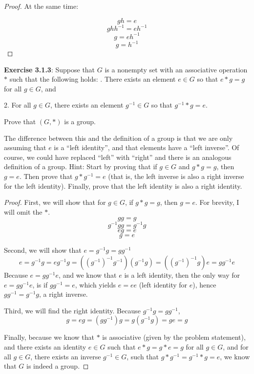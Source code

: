 \documentclass[a4paper]{article}
\begin{document}
\begin{myparindent}{0pt}
\begin{proof}
  At the same time:

  \[ gh = e \]
  \[ ghh^{-1} = eh^{-1} \]
  \[ g = eh^{-1} \]
  \[ g = h^{-1} \]
\end{proof}

\textbf{Exercise 3.1.3}:
Suppose that $G$ is a nonempty set with an associative operation $*$ such that
the following holds: . There exists an element $e \in G$ so that $e * g = g$ for all $g \in G$, and

2. For all $g \in G$, there exists an element $g^{-1} \in G$ so that
$g^{-1} * g = e$.

Prove that $(G, *)$ is a group. \newline

The difference between this and the definition of a group is that we are only
assuming that $e$ is a “left identity”, and that elements have a “left inverse”.
Of course, we could have replaced “left” with “right” and there is an analogous
definition of a group. Hint: Start by proving that if $g \in G$ and
$g * g = g$, then $g = e$. Then prove that $g * g^{-1} = e$ (that is, the left
inverse is also a right inverse for the left identity). Finally, prove that the
left identity is also a right identity. \newline

\begin{proof}
  First, we will show that for $g \in G$, if $g * g = g$, then $g = e$. For
  brevity, I will omit the $*$.
  \[ gg = g \]
  \[ g^{-1}gg = g^{-1} g \]
  \[ eg = e \]
  \[ g = e \]

  Second, we will show that $e = g^{-1}g = gg^{-1}$
  \[ e = g^{-1}g = eg^{-1}g = (({g^{-1}})^{-1}g^{-1}) (g^{-1}g) = (({g^{-1}})^{-1}g) e = gg^{-1}e \]
  Because $e = gg^{-1}e$, and we know that $e$ is a left identity, then the only
  way for $e = gg^{-1}e$, is if $gg^{-1} = e$, which yields $e = ee$ (left identity for $e$), hence $gg^{-1} = g^{-1}g$,
  a right inverse. \newline

  Third, we will find the right identity. Because $g^{-1}g = gg^{-1}$,
  \[ g = eg = (gg^{-1})g = g(g^{-1}g) = ge = g \]

  Finally, because we know that $*$ is associative (given by the problem
  statement), and there exists an identity $e \in G$ such that
  $e * g = g * e = g$ for all $g \in G$, and for all $g \in G$, there exists
  an inverse $g^{-1} \in G$, such that $g * g^{-1} = g^{-1} * g = e$, we know
  that $G$ is indeed a group.
\end{proof}

\end{myparindent}
\end{document}
